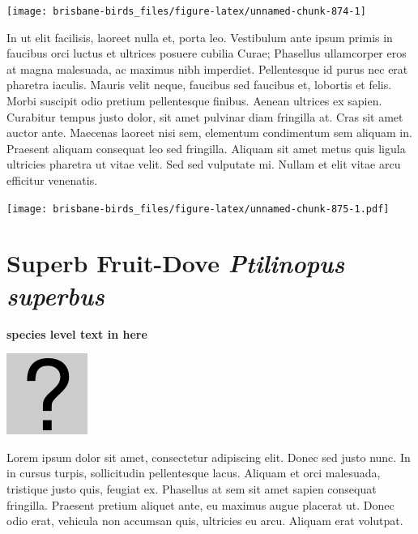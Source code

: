 \documentclass[]{book}
\let\origfigure\figure
\let\endorigfigure\endfigure
\renewenvironment{figure}[1][2] {
  \expandafter\origfigure\expandafter[H]
} {
  \endorigfigure
}
\begin{document}
\begin{figure}
\texttt{[image: brisbane-birds\_files/figure-latex/unnamed-chunk-874-1]} \caption{insert figure caption}\label{fig:unnamed-chunk-874}
\end{figure}

In ut elit facilisis, laoreet nulla et, porta leo. Vestibulum ante ipsum
primis in faucibus orci luctus et ultrices posuere cubilia Curae;
Phasellus ullamcorper eros at magna malesuada, ac maximus nibh
imperdiet. Pellentesque id purus nec erat pharetra iaculis. Mauris velit
neque, faucibus sed faucibus et, lobortis et felis. Morbi suscipit odio
pretium pellentesque finibus. Aenean ultrices ex sapien. Curabitur
tempus justo dolor, sit amet pulvinar diam fringilla at. Cras sit amet
auctor ante. Maecenas laoreet nisi sem, elementum condimentum sem
aliquam in. Praesent aliquam consequat leo sed fringilla. Aliquam sit
amet metus quis ligula ultricies pharetra ut vitae velit. Sed sed
vulputate mi. Nullam et elit vitae arcu efficitur venenatis.

\begin{figure}
\centering
\texttt{[image: brisbane-birds\_files/figure-latex/unnamed-chunk-875-1.pdf]}
\caption{\label{fig:unnamed-chunk-875}insert figure caption}
\end{figure}

\section{\texorpdfstring{Superb Fruit-Dove \emph{Ptilinopus
superbus}}{Superb Fruit-Dove Ptilinopus superbus}}\label{superb-fruit-dove-ptilinopus-superbus}

\textbf{species level text in here}

\begin{figure}
\centering
\includegraphics{assets/missing.png}
\caption{No image for species}
\end{figure}

Lorem ipsum dolor sit amet, consectetur adipiscing elit. Donec sed justo
nunc. In in cursus turpis, sollicitudin pellentesque lacus. Aliquam et
orci malesuada, tristique justo quis, feugiat ex. Phasellus at sem sit
amet sapien consequat fringilla. Praesent pretium aliquet ante, eu
maximus augue placerat ut. Donec odio erat, vehicula non accumsan quis,
ultricies eu arcu. Aliquam erat volutpat.
\end{document}
